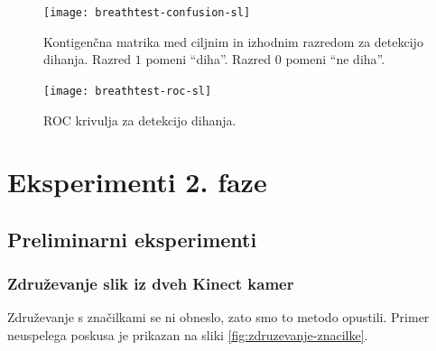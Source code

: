 \begin{figure}[!htbp]
	\centering
	\texttt{[image: breathtest-confusion-sl]}
	\caption[Kontigenčna matrika za detekcijo dihanja]{Kontigenčna matrika med ciljnim in izhodnim razredom za detekcijo dihanja. Razred $1$ pomeni ``diha''. Razred $0$ pomeni ``ne diha''.}
	\label{fig:breathtest-confusion}
\end{figure}

\begin{figure}[!htbp]
	\centering
	\texttt{[image: breathtest-roc-sl]}
	\caption[ROC krivulja za detekcijo dihanja]{ROC krivulja za detekcijo dihanja.}
	\label{fig:breathtest-roc}
\end{figure}




























\section{Eksperimenti 2. faze}
\subsection{Preliminarni eksperimenti}
\subsubsection{Združevanje slik iz dveh Kinect kamer}\label{sec:rezultati-zdruzevanje}
Združevanje s značilkami se ni obneslo, zato smo to metodo opustili. Primer neuspelega poskusa je prikazan na sliki \ref{fig:zdruzevanje-znacilke}.

